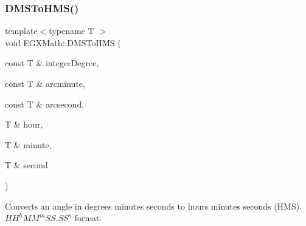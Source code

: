\subsubsection{\texorpdfstring{D\+M\+S\+To\+H\+M\+S()}{DMSToHMS()}}
{\footnotesize\ttfamily template$<$typename T $>$ \\
void E\+G\+X\+Math\+::\+D\+M\+S\+To\+H\+MS (\begin{DoxyParamCaption}\item[{const T \&}]{integer\+Degree,  }\item[{const T \&}]{arcminute,  }\item[{const T \&}]{arcsecond,  }\item[{T \&}]{hour,  }\item[{T \&}]{minute,  }\item[{T \&}]{second }\end{DoxyParamCaption})}



Converts an angle in degrees minutes seconds to hours minutes seconds (H\+MS). ${HH}^h{MM}^m{SS.SS}^s$ format. 

